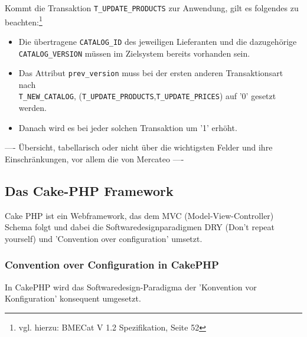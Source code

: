 	Kommt die Transaktion \texttt{T\_UPDATE\_PRODUCTS} zur Anwendung, gilt es folgendes zu beachten:\footnote{vgl. hierzu: BMECat V 1.2 Spezifikation, Seite 52} 
	\begin{itemize}
		\item Die übertragene \texttt{CATALOG\_ID} des jeweiligen Lieferanten und die dazugehörige\\ \texttt{CATALOG\_VERSION} müssen im Zielsystem bereits vorhanden sein.
		\item Das Attribut \texttt{prev\_version} muss bei der ersten anderen Transaktionsart nach\\ \texttt{T\_NEW\_CATALOG}, (\texttt{T\_UPDATE\_PRODUCTS},\texttt{T\_UPDATE\_PRICES}) auf '0' gesetzt werden.
		\item Danach wird es bei jeder solchen Transaktion um '1' erhöht.
	\end{itemize}
	
	
	---- Übersicht, tabellarisch oder nicht über die wichtigsten Felder und ihre Einschränkungen, vor allem die von Mercateo ----
	
	\subsection{Das Cake-PHP Framework}
	
	Cake PHP ist ein Webframework, das dem MVC (Model-View-Controller) Schema folgt und dabei die Softwaredesignparadigmen DRY (Don't repeat yourself) und 'Convention over configuration' umsetzt. 
	
	\subsubsection{Convention over Configuration in CakePHP}
	
	In CakePHP wird das Softwaredesign-Paradigma der 'Konvention vor Konfiguration' konsequent umgesetzt.\newline 
	

